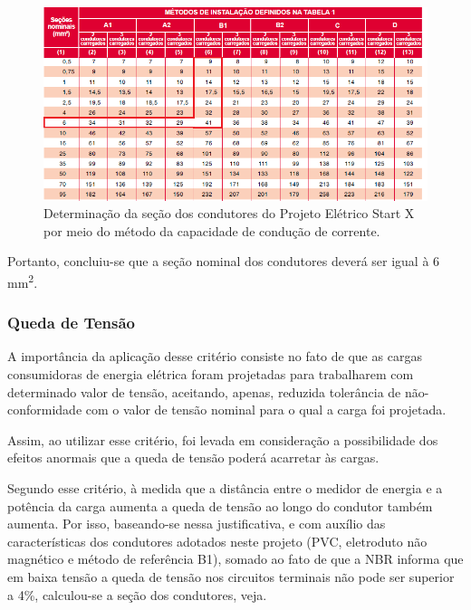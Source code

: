  \begin{figure}[h]
	\centering
	\includegraphics[scale=0.7]		{figuras/secao_condutores.png}
	\caption{Determinação da seção dos condutores do Projeto Elétrico Start X por meio do método da capacidade de condução de corrente.}
	\label{secao-condutores}
\end{figure}

Portanto, concluiu-se que a seção nominal dos condutores deverá ser igual à 6 mm\textsuperscript{2}.

\subsubsection{Queda de Tensão}

A importância da aplicação desse critério consiste no fato de que as cargas consumidoras de energia elétrica foram projetadas para trabalharem com determinado valor de tensão, aceitando, apenas, reduzida tolerância de não-conformidade com o valor de tensão nominal para o qual a carga foi projetada.

Assim, ao utilizar esse critério, foi levada em consideração a possibilidade dos efeitos anormais que a queda de tensão poderá acarretar às cargas.

 	Segundo esse critério, à medida que a distância entre o medidor de energia e a potência da carga aumenta a queda de tensão ao longo do condutor também aumenta. Por isso, baseando-se nessa justificativa, e com auxílio das características dos condutores adotados neste projeto (PVC, eletroduto não magnético e método de referência B1), somado ao fato de que a NBR informa que em baixa tensão a queda de tensão nos circuitos terminais não pode ser superior a 4\%, calculou-se a seção dos condutores, veja.
 	
